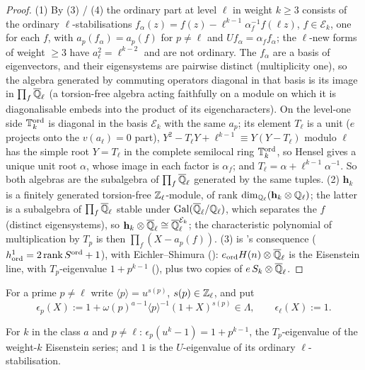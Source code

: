 \documentclass[11pt]{article}
\newcommand{\Iw}{\Lambda}                         %
\newcommand{\hcusp}{\mathbf{h}}                   %
\newcommand{\ee}{\epsilon}                        %
\newcommand{\Ek}{\mathcal{E}}                     %
\newcommand{\Qlb}{\overline{\Q}_\ell}
\newcommand{\Zl}{\Z_\ell}
\newcommand{\Ql}{\Q_\ell}
\begin{document}
\begin{proof}
(1) By (3) / (4) the ordinary part at level $\ell$ in weight $k\ge3$ consists
of the ordinary $\ell$-stabilisations $f_\alpha(z)=f(z)-\ell^{k-1}\alpha_f^{-1}f(\ell z)$, $f\in\Ek_k$, one for each $f$, with
$a_p(f_\alpha)=a_p(f)$ for $p\ne\ell$ and $U f_\alpha=\alpha_f f_\alpha$; the $\ell$-new forms of weight $\ge3$ have
$a_\ell^{2}=\ell^{k-2}$ and are not ordinary. The $f_\alpha$ are a basis of eigenvectors, and their eigensystems are pairwise
distinct (multiplicity one), so the algebra generated by commuting operators diagonal in that basis is its image in
$\prod_f\Qlb$ (a torsion-free algebra acting faithfully on a module on which it is diagonalisable embeds into the product of its
eigencharacters). On the level-one side $\mathbb{T}^{\mathrm{ord}}_k$ is diagonal in the basis $\Ek_k$ with the same $a_p$; its
element $T_\ell$ is a unit ($e$ projects onto the $v(a_\ell)=0$ part), $Y^{2}-T_\ell Y+\ell^{k-1}\equiv Y(Y-T_\ell)$ modulo $\ell$
has the simple root $Y=T_\ell$ in the complete semilocal ring $\mathbb{T}^{\mathrm{ord}}_k$, so Hensel gives a unique unit root
$\alpha$, whose image in each factor is $\alpha_f$; and $T_\ell=\alpha+\ell^{k-1}\alpha^{-1}$. So both algebras are the
subalgebra of $\prod_f\Qlb$ generated by the same tuples. (2) $\hcusp_k$ is a finitely generated torsion-free $\Zl$-module, of
rank $\dim_{\Ql}(\hcusp_k\otimes\Ql)$; the latter is a subalgebra of $\prod_f\Qlb$ stable under $\mathrm{Gal}(\Qlb/\Ql)$, which
separates the $f$ (distinct eigensystems), so $\hcusp_k\otimes\Qlb\cong\Qlb^{\Ek_k}$; the characteristic polynomial of
multiplication by $T_p$ is then $\prod_f(X-a_p(f))$. (3) is 's consequence ($h^{1}_{\mathrm{ord}}=2\operatorname{rank}
S^{\mathrm{ord}}+1$), with Eichler--Shimura (): $\eord H(n)\otimes\Qlb$ is the Eisenstein line, with $T_p$-eigenvalue
$1+p^{k-1}$ (), plus two copies of $e\,S_k\otimes\Qlb$.
\end{proof}

\begin{definition}[The $\Iw$-adic Eisenstein character]\label{def:u-eischar}
For a prime $p\ne\ell$ write $\langle p\rangle=u^{s(p)}$, $s(p)\in\Zl$, and put
\[
  \ee_p(X):=1+\omega(p)^{a-1}\langle p\rangle^{-1}(1+X)^{s(p)}\in\Iw,\qquad \ee_\ell(X):=1 .
\]
\end{definition}

\begin{lemma}\label{lem:u-eischar}
\PROVED{} For $k$ in the class $a$ and $p\ne\ell$: $\ee_p(u^{k}-1)=1+p^{k-1}$, the $T_p$-eigenvalue of the weight-$k$
Eisenstein series; and $1$ is the $U$-eigenvalue of its ordinary $\ell$-stabilisation.
\end{lemma}
\end{document}
